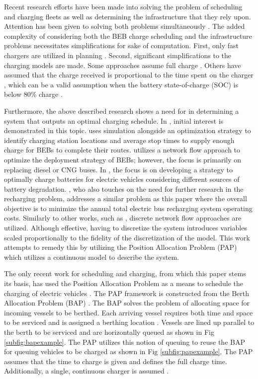 \documentclass[letterpaper, 10pt, conference]{IEEEtran}
\begin{document}
Recent research efforts have been made into solving the problem of scheduling and charging fleets as well as determining
the infrastructure that they rely upon. Attention has been given to solving both problems simultaneously \cite{Wei2018,
  Sebastiani2016, Hoke2014, Wang2017}. The added complexity of considering both the BEB charge scheduling and the
infrastructure problems necessitates simplifications for sake of computation. First, only fast chargers are utilized in
planning \cite{Wei2018, Sebastiani2016, Wang2017, Zhou2020, Liu2020, Yang2018, Wang2017a, Qin2016}. Second, significant
simplifications to the charging models are made. Some approaches assume full charge \cite{Wei2018, Wang2017, Zhou2020,
  Wang2017a}. Others have assumed that the charge received is proportional to the time spent on the charger
\cite{Liu2020, Yang2018}, which can be a valid assumption when the battery state-of-charge (SOC) is below 80\% charge
\cite{Liu2020}.

Furthermore, the above described research shows a need for in determining a system that outputs an optimal charging
schedule. In \cite{Wei2018, Sebastiani2016, Wang2017}, initial interest is demonstrated in this topic.
\cite{Sebastiani2016} uses simulation alongside an optimization strategy to identify charging station locations and
average stop times to supply enough charge for BEBs to complete their routes. \cite{Wei2018} utilizes a network flow
approach to optimize the deployment strategy of BEBs; however, the focus is primarily on replacing diesel or CNG buses.
In \cite{Hoke2014}, the focus is on developing a strategy to optimally charge batteries for electric vehicles
considering different sources of battery degradation. \cite{Wang2017}, who also touches on the need for further research
in the recharging problem, addresses a similar problem as this paper where the overall objective is to minimize the
annual total electric bus recharging system operating costs. Similarly to other works, such as \cite{Wei2018}, discrete
network flow approaches are utilized. Although effective, having to discretize the system introduces variables scaled
proportionally to the fidelity of the discretization of the model. This work attempts to remedy this by utilizing the
Position Allocation Problem (PAP) which utilizes a continuous model to describe the system.

The only recent work for scheduling and charging, from which this paper stems its basis, has used the Position
Allocation Problem as a means to schedule the charging of electric vehicles \cite{Qarebagh2019}. The PAP framework is
constructed from the Berth Allocation Problem (BAP) \cite{Qarebagh2019}. The BAP solves the problem of allocating space
for incoming vessels to be berthed. Each arriving vessel requires both time and space to be serviced and is assigned a
berthing location \cite{Imai2001}. Vessels are lined up parallel to the berth to be serviced and are horizontally queued
as shown in Fig \ref{subfig:bapexample}. The PAP utilizes this notion of queuing to reuse the BAP for queuing vehicles
to be charged as shown in Fig \ref{subfig:papexample}. The PAP assumes that the time to charge is given and defines the
full charge time. Additionally, a single, continuous charger is assumed \cite{Qarebagh2019}.
\end{document}
